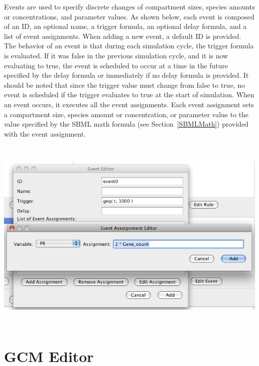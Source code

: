 \documentclass[titlepage,11pt]{article}
\begin{document}
\noindent
Events are used to specify discrete changes of compartment sizes, 
species amounts or concentrations, and parameter values.  
As shown below, each event 
is composed of an ID, an optional name, a trigger formula, an optional
delay formula, and a list of event assignments.  When adding a new
event, a default ID is provided.  The behavior of an event is that during 
each simulation cycle, the trigger formula is evaluated.  If it was false
in the previous simulation cycle, and it is now evaluating to true,
the event is scheduled to occur at a time in the future specified by 
the delay formula or immediately if no delay formula is provided.  
It should be noted that since the trigger value must change from false
to true, no event is scheduled if the trigger evaluates to true at the 
start of simulation.  When an event occurs, it executes all the event 
assignments.  Each event assignment sets a compartment size, species 
amount or concentration, or parameter value to the value specified by
the SBML math formula (see Section~\ref{SBMLMath}) provided with the event
assignment.  
\begin{center}
\includegraphics[height=95mm]{screenshots/event}
\end{center}

\section{\label{GCMEdit}GCM Editor}
\end{document}
